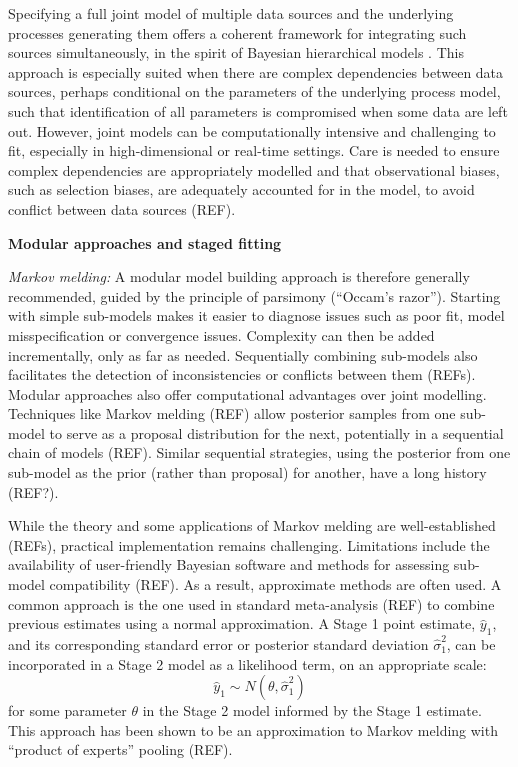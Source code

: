 \documentclass{article}
\begin{document}
Specifying a full joint model of multiple data sources and the underlying processes generating them offers a coherent framework for integrating such sources simultaneously, in the spirit of Bayesian hierarchical models \citep{gelman2020bayesian}. This approach is especially suited when there are complex dependencies between data sources, perhaps conditional on the parameters of the underlying process model, such that identification of all parameters is compromised when some data are left out. However, joint models can be computationally intensive and challenging to fit, especially in high-dimensional or real-time settings. Care is needed to ensure complex dependencies are appropriately modelled and that observational biases, such as selection biases, are adequately accounted for in the model, to avoid conflict between data sources (REF). 

\textbf{Modular approaches and staged fitting}

\textit{Markov melding: }A modular model building approach \citep{nicholson2022interoperability} is therefore generally recommended, guided by the principle of parsimony (``Occam's razor''). 
Starting with simple sub-models makes it easier to diagnose issues such as poor fit, model misspecification or convergence issues. Complexity can then be added incrementally, only as far as needed. Sequentially combining sub-models also facilitates the detection of inconsistencies or conflicts between them (REFs). Modular approaches also offer computational advantages over joint modelling. Techniques like Markov melding (REF) allow posterior samples from one sub-model to serve as a proposal distribution for the next, potentially in a sequential chain of models (REF). Similar sequential strategies, using the posterior from one sub-model as the prior (rather than proposal) for another, have a long history (REF?).

While the theory and some applications of Markov melding are well-established (REFs), practical implementation remains challenging. Limitations include the availability of user-friendly Bayesian software and methods for assessing sub-model compatibility (REF). As a result, approximate methods are often used. A common approach is the one used in standard meta-analysis (REF) to combine previous estimates using a normal approximation. A Stage 1 point estimate, $\hat{y}_1$, and its corresponding standard error or posterior standard deviation $\hat{\sigma}^2_1$, can be incorporated in a Stage 2 model as a likelihood term, on an appropriate scale:
$$
\hat{y}_1 \sim N(\theta, \hat{\sigma}^2_1)
$$ for some parameter $\theta$ in the Stage 2 model informed by the Stage 1 estimate. This approach has been shown to be an approximation to Markov melding with ``product of experts'' pooling (REF).
\end{document}
